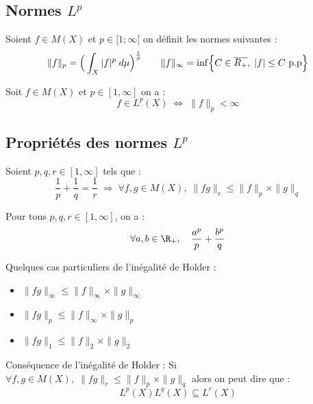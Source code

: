 \subsection{Normes $L^p$}

\begin{definition}[Normes $L^p$]
    Soient $f \in M(X)$ et $p \in [1;\infty[$ on définit les normes suivantes :
    \[ 
        \|f\|_p = \Big( \int_X |f|^p \; d \mu \Big)^{\frac{1}{p}} \qquad 
        \|f\|_\infty  = \inf \Bigl\{ C \in \overline{R_+}, \; |f| \leq C \text{ p.p} \Bigr\}
    \]
\end{definition}

\begin{prop}
    Soit $f \in M(X)$ et $p \in [1,\infty]$ on a :
        \[ f \in L^p(X) \; \Longleftrightarrow \; \|f\|_p < \infty \]
\end{prop}

\newpage 

\subsection{Propriétés des normes $L^p$}

\begin{theorem}
    Soient $p,q,r \in [1,\infty]$ tels que :
        \[ \boxed{ \frac{1}{p} + \frac{1}{q} = \frac{1}{r} \; \Longrightarrow \; \forall f,g \in M(X), \; \|fg\|_r \leq \|f\|_p \times \|g\|_q } \] 
\end{theorem}

\begin{theorem}
    Pour tous $p,q,r \in [1,\infty]$, on a :
        \[ \forall a,b \in \R_+, \quad \frac{a^p}{p} + \frac{b^p}{q} \] 
\end{theorem}

\begin{remark} 
    Quelques cas particuliers de l'inégalité de Holder :
    
    \begin{itemize}
        \item $ \|fg\|_\infty \leq \| f \|_\infty \times \|g\|_\infty $
        \item $ \|fg\|_p \leq \|f\|_\infty \times \|g\|_p $
        \item $ \|fg\|_1 \leq \|f\|_2 \times \|g\|_2 $
    \end{itemize}
\end{remark}

\begin{remark} Conséquence de l'inégalité de Holder :
    Si $ \forall f,g \in M(X), \; \|fg\|_r \leq \|f\|_p \times \|g\|_q$ alors on peut dire que :
        \[ L^p(X) L^q(X) \subseteq L^r(X) \] 
\end{remark}

